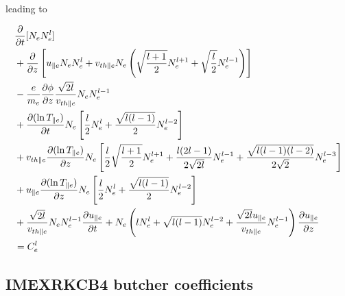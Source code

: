 \documentclass[final]{jpp}
\begin{document}
leading to

\begin{align} \label{eq:moment-hierarchy-appendix}
 &\frac{\partial}{\partial t}[N_e N_e^l] \nonumber\\
 &+\frac{\partial}{\partial z}\left[ u_{\parallel e}N_eN_e^l +  v_{th\parallel e} N_e\left(\sqrt{\frac{l+1}{2}} N_e^{l+1}+ \sqrt{\frac{l}{2}} N_e^{l-1}  \right) \right] \nonumber\\
&- \frac{e}{m_e} \frac{\partial \phi}{\partial z} \frac{\sqrt{2l}}{v_{th\parallel e}} N_e N_e^{l-1}\nonumber\\
&+ \frac{\partial (\ln T_{\parallel e} )}{\partial t} N_e \left[ \frac{l}{2}N_e^l+ \frac{\sqrt{l(l-1)}}{2}  N_e^{l-2} \right] \nonumber\\
&+ v_{th\parallel e} \frac{\partial(\ln T_{\parallel e})}{\partial z}N_e \left[  \frac{l}{2}\sqrt{\frac{l+1}{2}} N_e^{l+1}+\frac{l(2l-1)}{2\sqrt{2l}} N_e^{l-1} + \frac{\sqrt{l(l-1)(l-2)}}{2\sqrt{2}} N_e^{l-3}  \right] \nonumber \\
&+ u_{\parallel e} \frac{\partial (\ln T_{\parallel e})}{\partial z} N_e\left[ \frac{l}{2}N_e^l+ \frac{\sqrt{l(l-1)}}{2}N_e^{l-2} \right] \nonumber\\
& + \frac{\sqrt{2l}}{v_{th \parallel e}}  N_e N_e^{l-1} \frac{\partial u_{\parallel e}}{\partial t} + N_e\left( lN_e^l +\sqrt{l(l-1)}N_e^{l-2}+  \frac{\sqrt{2l} u_{\parallel e}}{v_{th\parallel e}} N_e^{l-1} \right) \frac{\partial u_{\parallel e}}{\partial z} \nonumber\\
&= C_e^l 
\end{align}

\subsection{IMEXRKCB4 butcher coefficients} \label{sec:imex-butcher}
\end{document}
